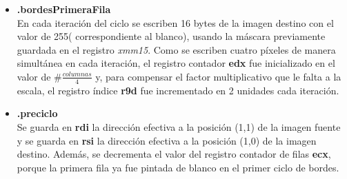 \documentclass[a4paper]{article}
\begin{document}
\begin{itemize}
	\item \textbf{.bordesPrimeraFila}\\
	 En cada iteración del ciclo se escriben 16 bytes de la imagen destino con el valor de 255( correspondiente al blanco), usando la máscara previamente guardada en el registro \textit{xmm15}. Como se escriben cuatro píxeles de manera simultánea en cada iteración, el registro contador \textbf{edx} fue inicializado en el valor de $\#\frac{columnas}{4}$ y, para compensar el factor multiplicativo que le falta a la escala, el registro índice \textbf{r9d} fue incrementado en 2 unidades cada iteración.  
	
	\item \textbf{.preciclo}\\
	Se guarda en \textbf{rdi} la dirección efectiva a la posición (1,1) de la imagen fuente y se guarda en \textbf{rsi} la dirección efectiva a la posición (1,0) de la imagen destino. Además, se decrementa el valor del registro contador de filas \textbf{ecx}, porque la primera fila ya fue pintada de blanco en el primer ciclo de bordes.  
	

\end{itemize}
\end{document}
